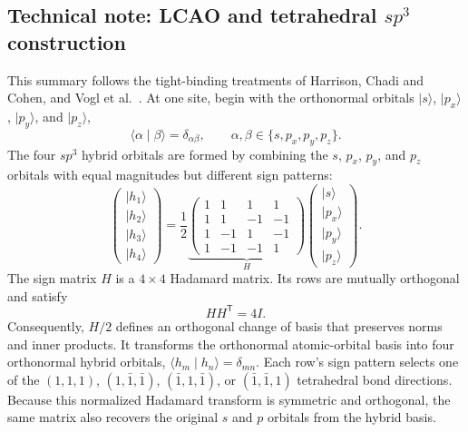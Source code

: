 \documentclass[11pt]{article}
\begin{document}
\subsection{Technical note: LCAO and tetrahedral \texorpdfstring{$sp^3$}{sp3} construction}

This summary follows the tight-binding treatments of Harrison, Chadi and Cohen, and
Vogl et al.~\cite{Harrison1980,ChadiCohen1975,Vogl1983}.  At one site, begin with the
orthonormal orbitals $\lvert s\rangle$, $\lvert p_x\rangle$, $\lvert p_y\rangle$, and
$\lvert p_z\rangle$,
\begin{equation}
  \langle \alpha\mid\beta\rangle=\delta_{\alpha\beta},
  \qquad \alpha,\beta\in\{s,p_x,p_y,p_z\}.
\end{equation}
The four $sp^3$ hybrid orbitals are formed by combining the $s$, $p_x$, $p_y$,
and $p_z$ orbitals with equal magnitudes but different sign patterns:
\begin{equation}
  \begin{pmatrix}
    \lvert h_1\rangle \\
    \lvert h_2\rangle \\
    \lvert h_3\rangle \\
    \lvert h_4\rangle
  \end{pmatrix}
  = \frac12
  \underbrace{
  \begin{pmatrix}
     1 &  1 &  1 &  1 \\
     1 &  1 & -1 & -1 \\
     1 & -1 &  1 & -1 \\
     1 & -1 & -1 &  1
  \end{pmatrix}}_{H}
  \begin{pmatrix}
    \lvert s\rangle \\
    \lvert p_x\rangle \\
    \lvert p_y\rangle \\
    \lvert p_z\rangle
  \end{pmatrix}.
\end{equation}
The sign matrix $H$ is a $4\times4$ Hadamard matrix.  Its rows are mutually
orthogonal and satisfy
\begin{equation}
  HH^{\mathsf{T}}=4I.
\end{equation}
Consequently, $H/2$ defines an orthogonal change of basis that preserves norms and
inner products.  It transforms the orthonormal atomic-orbital basis into four
orthonormal hybrid orbitals, $\langle h_m\mid h_n\rangle=\delta_{mn}$.  Each row's sign
pattern selects one of the $(1,1,1)$, $(1,\bar{1},\bar{1})$,
$(\bar{1},1,\bar{1})$, or $(\bar{1},\bar{1},1)$ tetrahedral bond directions.  Because
this normalized Hadamard transform is symmetric and orthogonal, the same matrix also
recovers the original $s$ and $p$ orbitals from the hybrid basis.
\end{document}
